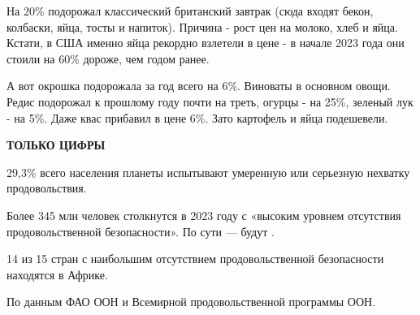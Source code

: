 На 20\% подорожал классический британский завтрак (сюда входят бекон, колбаски, яйца, тосты и напиток). Причина - рост цен на молоко, хлеб и яйца. Кстати, в США именно яйца рекордно взлетели в цене - в начале 2023 года они стоили на 60\% дороже, чем годом ранее.

А вот окрошка подорожала за год всего на 6\%. Виноваты в основном овощи. Редис подорожал к прошлому году почти на треть, огурцы - на 25\%, зеленый лук - на 5\%. Даже квас прибавил в цене 6\%. Зато картофель и яйца подешевели.

\textbf{ТОЛЬКО ЦИФРЫ}

29,3\% всего населения планеты испытывают умеренную или серьезную нехватку продовольствия.

Более 345 млн человек столкнутся в 2023 году с «высоким уровнем отсутствия продовольственной безопасности». По сути --- будут .

14 из 15 стран с наибольшим отсутствием продовольственной безопасности находятся в Африке.

По данным ФАО ООН и Всемирной продовольственной программы ООН.











